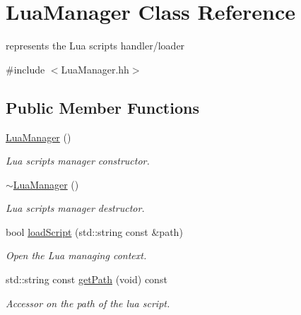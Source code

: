 \hypertarget{class_lua_manager}{}\section{Lua\+Manager Class Reference}
\label{class_lua_manager}


represents the Lua scripts handler/loader  




{\ttfamily \#include $<$Lua\+Manager.\+hh$>$}

\subsection*{Public Member Functions}
\begin{DoxyCompactItemize}
\item 
\mbox{\label{class_lua_manager_a11da08140b20bfb4e77ac117a6bc7a0a}} 
\hyperlink{class_lua_manager_a11da08140b20bfb4e77ac117a6bc7a0a}{Lua\+Manager} ()
\begin{DoxyCompactList}\small\item\em Lua scripts manager constructor. \end{DoxyCompactList}\item 
\mbox{\label{class_lua_manager_a26a821d05088bb1a6d7642b6312930aa}} 
\hyperlink{class_lua_manager_a26a821d05088bb1a6d7642b6312930aa}{$\sim$\+Lua\+Manager} ()
\begin{DoxyCompactList}\small\item\em Lua scripts manager destructor. \end{DoxyCompactList}\item 
bool \hyperlink{class_lua_manager_a113433dbaed2e770ed510610de8b6c4f}{load\+Script} (std\+::string const \&path)
\begin{DoxyCompactList}\small\item\em Open the Lua managing context. \end{DoxyCompactList}\item 
\mbox{\label{class_lua_manager_a75a90a4ec9cfa390c044be3ea1ee9377}} 
std\+::string const \hyperlink{class_lua_manager_a75a90a4ec9cfa390c044be3ea1ee9377}{get\+Path} (void) const
\begin{DoxyCompactList}\small\item\em Accessor on the path of the lua script. \end{DoxyCompactList}\item 

\end{DoxyCompactItemize}
